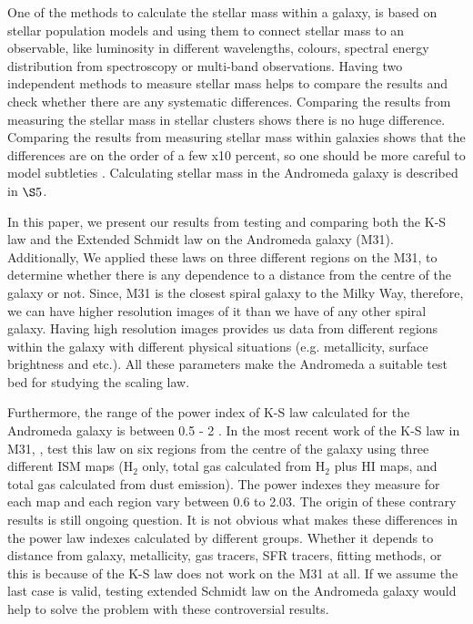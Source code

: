 \documentclass[useAMS,usenatbib]{mn2e}
\begin{document}
One of the methods to calculate the stellar mass within a galaxy, is based on stellar population models \citep[e.g.][]{ Bruzual93, Kotulla09} and using them to connect stellar mass to an observable, like luminosity in different wavelengths, colours, spectral energy distribution from spectroscopy or multi-band observations. Having two independent methods to measure stellar mass helps to compare the results and check whether there are any systematic differences. Comparing the results from measuring the stellar mass in stellar clusters shows there is no huge difference. Comparing the results from measuring stellar mass within galaxies shows that the differences are on the order of a few x10 percent, so one should be more careful to model subtleties \citep{McLaughlin05}. Calculating stellar mass in the Andromeda galaxy is described in $\S5$.

In this paper, we present our results from testing and comparing both the K-S law and the Extended Schmidt law on the Andromeda galaxy (M31). %
Additionally, We applied these laws on three different regions on the M31, to determine whether there is any dependence to a distance from the centre of the galaxy or not. Since, M31 is the closest spiral galaxy to the Milky Way, therefore, we can have higher resolution images of it than we have of any other spiral galaxy. Having high resolution images provides us data from different regions within the galaxy with different physical situations (e.g. metallicity, surface brightness and etc.). All these parameters make the Andromeda a suitable test bed for studying the scaling law.

Furthermore, the range of the power index of K-S law calculated for the Andromeda galaxy is between 0.5 - 2 \citep[e.g.,][]{Tabatabaei10,Ford13}. %
In the most recent work of the K-S law in M31, \cite{Ford13}, test this law on six regions from the centre of the galaxy using three different ISM maps (H$_2$ only, total gas calculated from H$_2$ plus HI maps, and total gas calculated from dust emission). The power indexes they measure for each map and each region vary between 0.6 to 2.03. The origin of these contrary results is still ongoing question. It is not obvious what makes these differences in the power law indexes calculated by different groups. Whether it depends to distance from galaxy, metallicity, gas tracers, SFR tracers, fitting methods, or this is because of the K-S law does not work on the M31 at all. If we assume the last case is valid, testing extended Schmidt law on the Andromeda galaxy would help to solve the problem with these controversial results.
\end{document}
